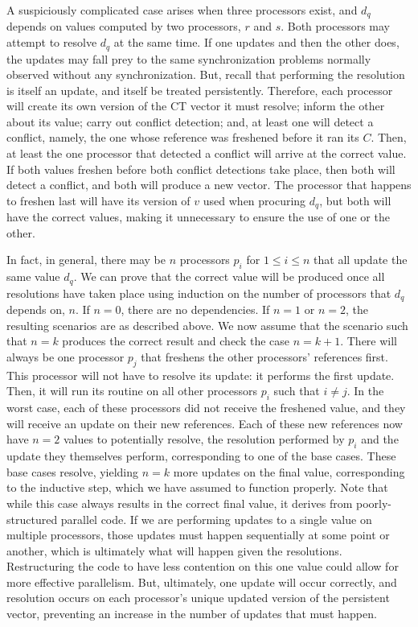 \documentclass[pageno]{jpaper}
\begin{document}
A suspiciously complicated case arises when three processors exist, and $d_q$
depends on values computed by two processors, $r$ and $s$. Both processors may
attempt to resolve $d_q$ at the same time. If one updates and then the other
does, the updates may fall prey to the same synchronization problems normally
observed without any synchronization. But, recall that performing the resolution
is itself an update, and itself be treated persistently. Therefore, each
processor will create its own version of the CT vector it must resolve; inform
the other about its value; carry out conflict detection; and, at least one will
detect a conflict, namely, the one whose reference was freshened before it ran
its $C$. Then, at least the one processor that detected a conflict will arrive
at the correct value. If both values freshen before both conflict detections
take place, then both will detect a conflict, and both will produce a new
vector. The processor that happens to freshen last will have its version of $v$
used when procuring $d_q$, but both will have the correct values, making it
unnecessary to ensure the use of one or the other.

In fact, in general, there may be $n$ processors $p_i$ for $1 \leq i \leq n$
that all update the same value $d_q$.  We can prove that the correct value will
be produced once all resolutions have taken place using induction on the number
of processors that $d_q$ depends on, $n$. If $n=0$, there are no dependencies.
If $n=1$ or $n=2$, the resulting scenarios are as described above. We now assume
that the scenario such that $n=k$ produces the correct result and check the case
$n=k+1$. There will always be one processor $p_j$ that freshens the other
processors' references first. This processor will not have to resolve its
update: it performs the first update. Then, it will run its routine on all
other processors $p_i$ such that $i \neq j$. In the worst case, each of these
processors did not receive the freshened value, and they will receive an update
on their new references. Each of these new references now have $n=2$ values to
potentially resolve, the resolution performed by $p_i$ and the update they
themselves perform, corresponding to one of the base cases. These base cases
resolve, yielding $n=k$ more updates on the final value, corresponding to the
inductive step, which we have assumed to function properly. Note that while this
case always results in the correct final value, it derives from
poorly-structured parallel code. If we are performing updates to a single value
on multiple processors, those updates must happen sequentially at some point or
another, which is ultimately what will happen given the resolutions.
Restructuring the code to have less contention on this one value could allow for
more effective parallelism. But, ultimately, one update will occur correctly,
and resolution occurs on each processor's unique updated version of the
persistent vector, preventing an increase in the number of updates that must
happen.
\end{document}
